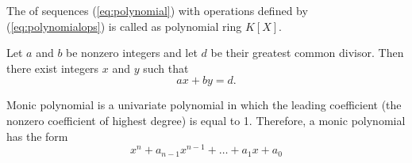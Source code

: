 \begin{definition}
  The  of sequences (\ref{eq:polynomial}) with
  operations defined by (\ref{eq:polynomialops}) is called as
  polynomial ring $K\left[X\right]$.
  \label{def:polynomial}
\end{definition}

\begin{lemma}
  Let $a$ and $b$ be nonzero integers and let $d$ be their greatest common
  divisor. Then there exist integers $x$ and $y$ such that 
  \[
  a x + by = d.
  \]
  \label{lem:bezout}
\end{lemma}

\begin{definition}
  Monic polynomial is a univariate polynomial in which the leading
  coefficient (the nonzero coefficient of highest degree) is equal to
  1. Therefore, a monic polynomial has the form
  \[
  x^n + a_{n-1}x^{n-1}+ \dots + a_1 x + a_0
  \]
  \label{def:monicpolynomial}
\end{definition}

